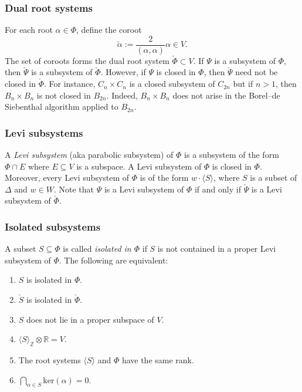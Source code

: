 \documentclass[12pt]{amsart}
\theoremstyle{plain}
\theoremstyle{definition}
\theoremstyle{remark}
\newcommand{\bbR}{\mathbb{R}}
\begin{document}
\subsubsection{Dual root systems}\label{s:dual} For each root $\alpha\in \Phi$, define the coroot 
\[
\check{\alpha}:=\frac{2}{(\alpha, \alpha)}\alpha\in V.
\]
 The set of coroots forms the dual root system $\check{\Phi}\subset V$. If $\Psi$ is a subsystem of $\Phi$, then $\check{\Psi}$ is a subsystem of $\check{\Phi}$. However, if $\Psi$ is closed in $\Phi$, then $\check{\Psi}$ need not be closed in $\check{\Phi}$. For instance, $C_n\times C_n$ is a closed subsystem of $C_{2n}$ but if $n>1$, then $B_n\times B_n$ is not closed in $B_{2n}$. Indeed, $B_n\times B_n$ does not arise in the Borel--de Siebenthal algorithm applied to $B_{2n}$.  

\subsubsection{Levi subsystems}
 A \emph{Levi subsystem} (aka parabolic subsystem)
   of $\Phi$ is a subsystem of the form $\Phi \cap E$ where $E\subseteq V$ is a subspace. 
  A Levi subsystem of $\Phi$ is closed in $\Phi$. Moreover, every Levi subsystem of $\Phi$ is of the form $w\cdot \langle S\rangle$, where $S$ is a subset of $\Delta$ and $w\in W$.  Note that $\Psi$ is a Levi subsystem of $\Phi$ if and only if $\check{\Psi}$ is a Levi subsystem of $\check{\Phi}$. 




\subsubsection{Isolated subsystems}\label{s:Isolated}
  A subset $S\subseteq \Phi$ is called \emph{isolated in $\Phi$} if $S$ is not contained in a proper Levi subsystem of $\Phi$. The following are equivalent: 
\begin{enumerate} 
\item $S$ is isolated in $\Phi$. 
\item $\check{S}$ is isolated in $\check{\Phi}$. 
\item $S$ does not lie in a proper subspace of $V$. 
\item $\langle S\rangle_{\mathbb{Z}}\otimes \bbR =V$.
\item The root systems $\langle S\rangle$ and $\Phi$ have the same rank. 
\item $\displaystyle \bigcap_{\alpha \in S} \mathrm{ker}(\alpha)=0$. 
\end{enumerate} 
 
\end{document}
